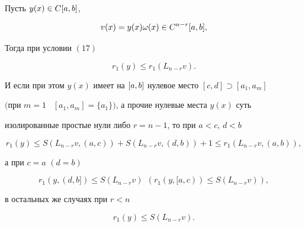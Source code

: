 \begin{lem}


Пусть $y(x)\in C[a,b]$,


\begin{equation}


v(x)=y(x)\omega(x)\in C^{n-r}\ab,


\end{equation}


Тогда при условии $(17)$


\begin{equation}


r_1(y)\le r_1(L_{n-r}v).


\end{equation}


И если при этом $y(x)$ имеет на $[a,b]$ нулевое место $[c,d]\supset[a_1,a_m]$


$($при $m=1$ \ $[a_1,a_m]=\{a_1\})$, а прочие нулевые места $y(x)$ суть


изолированные простые нули либо $r=n-1$, то при $a<c$, $d<b$


\begin{equation}


r_1(y)\le S(L_{n-r}v,(a,c))+S(L_{n-r}v,(d,b))+1\le


r_1(L_{n-r}v,(a,b)),


\end{equation}


а при $c=a$ $(d=b)$


\begin{equation}


r_1(y,(d,b])\le S(L_{n-r}v)\ \ (r_1(y, [a,c))\le S(L_{n-r}v)),


\end{equation}


в остальных же случаях при $r<n$


\begin{equation}


r_1(y)\le S(L_{n-r}v).


\end{equation}


\end{lem}









